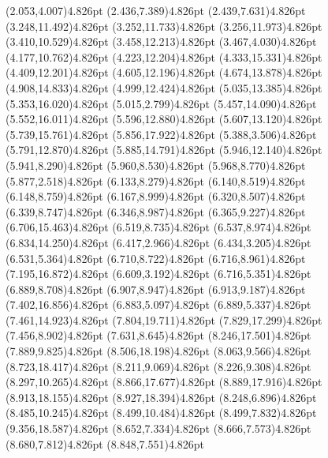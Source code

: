 \documentclass[10pt]{article}
\begin{document}
{{\qdisk(2.053,4.007){4.826pt}%
\qdisk(2.436,7.389){4.826pt}%
\qdisk(2.439,7.631){4.826pt}%
\qdisk(3.248,11.492){4.826pt}%
\qdisk(3.252,11.733){4.826pt}%
\qdisk(3.256,11.973){4.826pt}%
\qdisk(3.410,10.529){4.826pt}%
\qdisk(3.458,12.213){4.826pt}%
\qdisk(3.467,4.030){4.826pt}%
\qdisk(4.177,10.762){4.826pt}%
\qdisk(4.223,12.204){4.826pt}%
\qdisk(4.333,15.331){4.826pt}%
\qdisk(4.409,12.201){4.826pt}%
\qdisk(4.605,12.196){4.826pt}%
\qdisk(4.674,13.878){4.826pt}%
\qdisk(4.908,14.833){4.826pt}%
\qdisk(4.999,12.424){4.826pt}%
\qdisk(5.035,13.385){4.826pt}%
\qdisk(5.353,16.020){4.826pt}%
\qdisk(5.015,2.799){4.826pt}%
\qdisk(5.457,14.090){4.826pt}%
\qdisk(5.552,16.011){4.826pt}%
\qdisk(5.596,12.880){4.826pt}%
\qdisk(5.607,13.120){4.826pt}%
\qdisk(5.739,15.761){4.826pt}%
\qdisk(5.856,17.922){4.826pt}%
\qdisk(5.388,3.506){4.826pt}%
\qdisk(5.791,12.870){4.826pt}%
\qdisk(5.885,14.791){4.826pt}%
\qdisk(5.946,12.140){4.826pt}%
\qdisk(5.941,8.290){4.826pt}%
\qdisk(5.960,8.530){4.826pt}%
\qdisk(5.968,8.770){4.826pt}%
\qdisk(5.877,2.518){4.826pt}%
\qdisk(6.133,8.279){4.826pt}%
\qdisk(6.140,8.519){4.826pt}%
\qdisk(6.148,8.759){4.826pt}%
\qdisk(6.167,8.999){4.826pt}%
\qdisk(6.320,8.507){4.826pt}%
\qdisk(6.339,8.747){4.826pt}%
\qdisk(6.346,8.987){4.826pt}%
\qdisk(6.365,9.227){4.826pt}%
\qdisk(6.706,15.463){4.826pt}%
\qdisk(6.519,8.735){4.826pt}%
\qdisk(6.537,8.974){4.826pt}%
\qdisk(6.834,14.250){4.826pt}%
\qdisk(6.417,2.966){4.826pt}%
\qdisk(6.434,3.205){4.826pt}%
\qdisk(6.531,5.364){4.826pt}%
\qdisk(6.710,8.722){4.826pt}%
\qdisk(6.716,8.961){4.826pt}%
\qdisk(7.195,16.872){4.826pt}%
\qdisk(6.609,3.192){4.826pt}%
\qdisk(6.716,5.351){4.826pt}%
\qdisk(6.889,8.708){4.826pt}%
\qdisk(6.907,8.947){4.826pt}%
\qdisk(6.913,9.187){4.826pt}%
\qdisk(7.402,16.856){4.826pt}%
\qdisk(6.883,5.097){4.826pt}%
\qdisk(6.889,5.337){4.826pt}%
\qdisk(7.461,14.923){4.826pt}%
\qdisk(7.804,19.711){4.826pt}%
\qdisk(7.829,17.299){4.826pt}%
\qdisk(7.456,8.902){4.826pt}%
\qdisk(7.631,8.645){4.826pt}%
\qdisk(8.246,17.501){4.826pt}%
\qdisk(7.889,9.825){4.826pt}%
\qdisk(8.506,18.198){4.826pt}%
\qdisk(8.063,9.566){4.826pt}%
\qdisk(8.723,18.417){4.826pt}%
\qdisk(8.211,9.069){4.826pt}%
\qdisk(8.226,9.308){4.826pt}%
\qdisk(8.297,10.265){4.826pt}%
\qdisk(8.866,17.677){4.826pt}%
\qdisk(8.889,17.916){4.826pt}%
\qdisk(8.913,18.155){4.826pt}%
\qdisk(8.927,18.394){4.826pt}%
\qdisk(8.248,6.896){4.826pt}%
\qdisk(8.485,10.245){4.826pt}%
\qdisk(8.499,10.484){4.826pt}%
\qdisk(8.499,7.832){4.826pt}%
\qdisk(9.356,18.587){4.826pt}%
\qdisk(8.652,7.334){4.826pt}%
\qdisk(8.666,7.573){4.826pt}%
\qdisk(8.680,7.812){4.826pt}%
\qdisk(8.848,7.551){4.826pt}%
}}
\end{document}
